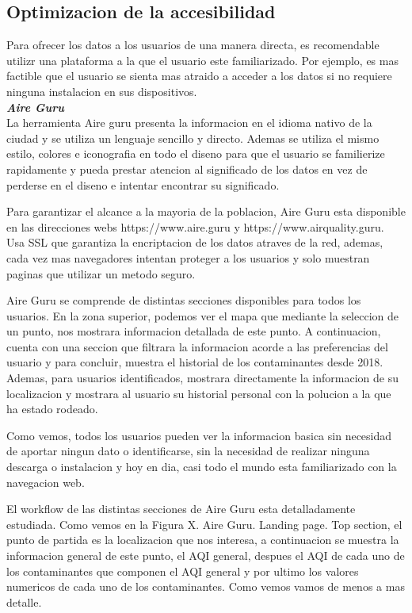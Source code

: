 \subsection{Optimizacion de la accesibilidad}

Para ofrecer los datos a los usuarios de una manera directa, es recomendable utilizr una plataforma a la que el usuario
este familiarizado. Por ejemplo, es mas factible que el usuario se sienta mas atraido a acceder a los datos si no requiere
ninguna instalacion en sus dispositivos.\\


\noindent\textbf{\textit{Aire Guru} }\\


La herramienta Aire guru presenta la informacion en el idioma nativo de la ciudad y se utiliza un lenguaje sencillo y directo.
Ademas se utiliza el mismo estilo, colores e iconografia en todo el diseno para que el usuario se familierize rapidamente y pueda
prestar atencion al significado de los datos en vez de perderse en el diseno e intentar encontrar su significado.

Para garantizar el alcance a la mayoria de la poblacion, Aire Guru esta disponible en las direcciones webs https://www.aire.guru y https://www.airquality.guru.
Usa SSL que garantiza la encriptacion de los datos atraves de la red, ademas, cada vez mas navegadores intentan proteger a los usuarios y
solo muestran paginas que utilizar un metodo seguro. 

Aire Guru se comprende de distintas secciones disponibles para todos los usuarios. En la zona superior, podemos ver el mapa que mediante la seleccion de un punto, nos
mostrara informacion detallada de este punto. A continuacion, cuenta con una seccion que filtrara la informacion acorde a las preferencias del usuario
y para concluir, muestra el historial de los contaminantes desde 2018.
Ademas, para usuarios identificados, mostrara directamente la informacion de su localizacion y mostrara al usuario su historial personal
con la polucion a la que ha estado rodeado.

Como vemos, todos los usuarios pueden ver la informacion basica sin necesidad de aportar ningun dato o identificarse, sin la necesidad de 
realizar ninguna descarga o instalacion y hoy en dia, casi todo el mundo esta familiarizado con la navegacion web.

El workflow de las distintas secciones de Aire Guru esta detalladamente estudiada. Como vemos en la Figura X. Aire Guru. Landing page. Top section, el punto de partida es la localizacion que nos interesa,
a continuacion se muestra la informacion general de este punto, el AQI general, despues el AQI de cada uno de los contaminantes que componen el 
AQI general y por ultimo los valores numericos de cada uno de los contaminantes. Como vemos vamos de menos a mas detalle.


